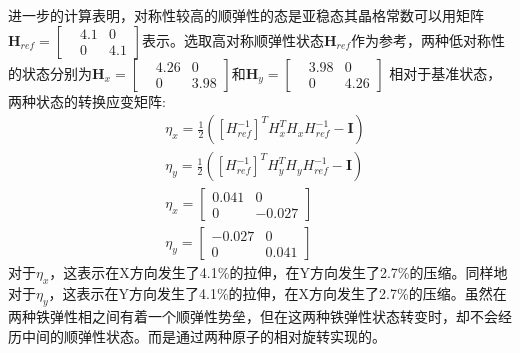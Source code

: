 进一步的计算表明，对称性较高的顺弹性的态是亚稳态其晶格常数可以用矩阵$\bm{H}_{ref}=\begin{bmatrix}
    &4.1&0\\
    &0&4.1
\end{bmatrix}$表示。选取高对称顺弹性状态$\bm{H}_{ref}$作为参考，两种低对称性的状态分别为$\bm{H}_{x}=\begin{bmatrix}
    &4.26&0\\
    &0&3.98
\end{bmatrix}$和$\bm{H}_{y}=\begin{bmatrix}
    &3.98&0\\
    &0&4.26
\end{bmatrix}$
相对于基准状态，两种状态的转换应变矩阵:
\begin{equation}
    \begin{split}
        &\eta_{x}=\frac{1}{2}([H_{ref}^{-1}]^{T}H_{x}^{T}H_{x}H_{ref}^{-1}-\bm{I})\\
        &\eta_{y}=\frac{1}{2}([H_{ref}^{-1}]^{T}H_{y}^{T}H_{y}H_{ref}^{-1}-\bm{I})\\
        &\eta_{x}=\begin{bmatrix}
            0.041&0\\
            0&-0.027
        \end{bmatrix}\\
        &\eta_{y}=\begin{bmatrix}
            -0.027&0\\
            0&0.041
        \end{bmatrix}
    \end{split}
    \label{eq:txxb}
\end{equation}
对于$\eta_{x}$，这表示在X方向发生了4.1\%的拉伸，在Y方向发生了2.7\%的压缩。同样地对于$\eta_{y}$，这表示在Y方向发生了4.1\%的拉伸，在X方向发生了2.7\%的压缩。虽然在两种铁弹性相之间有着一个顺弹性势垒，但在这两种铁弹性状态转变时，却不会经历中间的顺弹性状态。而是通过两种原子的相对旋转实现的。

